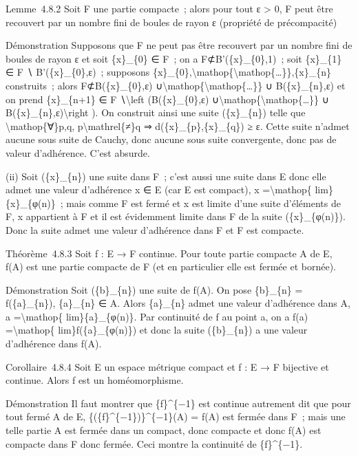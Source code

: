 \documentclass[]{article}
\begin{document}
Lemme~4.8.2 Soit F une partie compacte~; alors pour tout ε
\textgreater{} 0, F peut être recouvert par un nombre fini de boules de
rayon ε (propriété de précompacité)

Démonstration Supposons que F ne peut pas être recouvert par un nombre
fini de boules de rayon ε et soit \{x\}\_\{0\} ∈ F~; on a
F⊄B'(\{x\}\_\{0\},1)~; soit \{x\}\_\{1\} ∈ F ∖ B'(\{x\}\_\{0\},ε)~;
supposons
\{x\}\_\{0\},\textbackslash{}mathop\{\textbackslash{}mathop\{\ldots{}\}\},\{x\}\_\{n\}
construits~; alors F⊄B(\{x\}\_\{0\},ε)
∪\textbackslash{}mathop\{\textbackslash{}mathop\{\ldots{}\}\} ∪
B(\{x\}\_\{n\},ε) et on prend \{x\}\_\{n+1\} ∈ F ∖\textbackslash{}left
(B(\{x\}\_\{0\},ε)
∪\textbackslash{}mathop\{\textbackslash{}mathop\{\ldots{}\}\} ∪
B(\{x\}\_\{n\},ε)\textbackslash{}right ). On construit ainsi une suite
(\{x\}\_\{n\}) telle que \textbackslash{}mathop\{∀\}p,q,
p\textbackslash{}mathrel\{≠\}q ⇒ d(\{x\}\_\{p\},\{x\}\_\{q\}) ≥ ε. Cette
suite n'admet aucune sous suite de Cauchy, donc aucune sous suite
convergente, donc pas de valeur d'adhérence. C'est absurde.

(ii) Soit (\{x\}\_\{n\}) une suite dans F~; c'est aussi une suite dans E
donc elle admet une valeur d'adhérence x ∈ E (car E est compact), x
=\textbackslash{}mathop\{ lim\}\{x\}\_\{φ(n)\}~; mais comme F est fermé
et x est limite d'une suite d'éléments de F, x appartient à F et il est
évidemment limite dans F de la suite (\{x\}\_\{φ(n)\}). Donc la suite
admet une valeur d'adhérence dans F et F est compacte.

Théorème~4.8.3 Soit f : E → F continue. Pour toute partie compacte A de
E, f(A) est une partie compacte de F (et en particulier elle est fermée
et bornée).

Démonstration Soit (\{b\}\_\{n\}) une suite de f(A). On pose
\{b\}\_\{n\} = f(\{a\}\_\{n\}), \{a\}\_\{n\} ∈ A. Alors \{a\}\_\{n\}
admet une valeur d'adhérence dans A, a =\textbackslash{}mathop\{
lim\}\{a\}\_\{φ(n)\}. Par continuité de f au point a, on a f(a)
=\textbackslash{}mathop\{ lim\}f(\{a\}\_\{φ(n)\}) et donc la suite
(\{b\}\_\{n\}) a une valeur d'adhérence dans f(A).

Corollaire~4.8.4 Soit E un espace métrique compact et f : E → F
bijective et continue. Alors f est un homéomorphisme.

Démonstration Il faut montrer que \{f\}\^{}\{−1\} est continue autrement
dit que pour tout fermé A de E, \{(\{f\}\^{}\{−1\})\}\^{}\{−1\}(A) =
f(A) est fermée dans F~; mais une telle partie A est fermée dans un
compact, donc compacte et donc f(A) est compacte dans F donc fermée.
Ceci montre la continuité de \{f\}\^{}\{−1\}.
\end{document}
